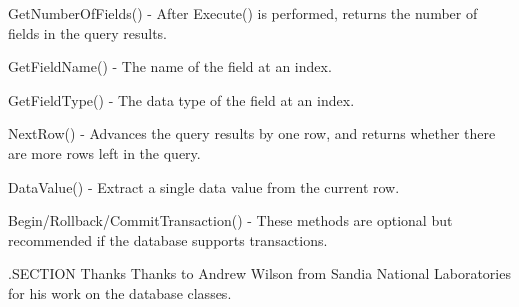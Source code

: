 Get\-Number\-Of\-Fields() -\/ After Execute() is performed, returns the number of fields in the query results.

Get\-Field\-Name() -\/ The name of the field at an index.

Get\-Field\-Type() -\/ The data type of the field at an index.

Next\-Row() -\/ Advances the query results by one row, and returns whether there are more rows left in the query.

Data\-Value() -\/ Extract a single data value from the current row.

Begin/\-Rollback/\-Commit\-Transaction() -\/ These methods are optional but recommended if the database supports transactions.

.S\-E\-C\-T\-I\-O\-N Thanks Thanks to Andrew Wilson from Sandia National Laboratories for his work on the database classes.

